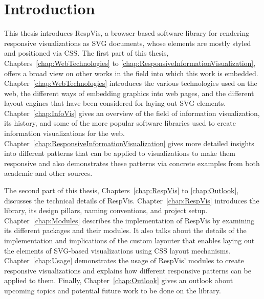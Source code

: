 \chapter{Introduction}
\label{chap:Introduction}

This thesis introduces RespVis, a browser-based software library for rendering responsive visualizations as SVG documents, whose elements are mostly styled and positioned via CSS.
The first part of this thesis, Chapters~\ref{chap:WebTechnologies} to \ref{chap:ResponsiveInformationVisualization}, offers a broad view on other works in the field into which this work is embedded. Chapter~\ref{chap:WebTechnologies} introduces the various technologies used on the web, the different ways of embedding graphics into web pages, and the different layout engines that have been considered for laying out SVG elements.
Chapter~\ref{chap:InfoVis} gives an overview of the field of information visualization, its history, and some of the more popular software libraries used to create information visualizations for the web.
Chapter~\ref{chap:ResponsiveInformationVisualization} gives more detailed insights into different patterns that can be applied to visualizations to make them responsive and also demonstrates these patterns via concrete examples from both academic and other sources.

The second part of this thesis, Chapters~\ref{chap:RespVis} to \ref{chap:Outlook}, discusses the technical details of RespVis. 
Chapter~\ref{chap:RespVis} introduces the library, its design pillars, naming conventions, and project setup.
Chapter~\ref{chap:Modules} describes the implementation of RespVis by examining its different packages and their modules. 
It also talks about the details of the implementation and implications of the custom layouter that enables laying out the elements of SVG-based visualizations using CSS layout mechanisms.
Chapter~\ref{chap:Usage} demonstrates the usage of RespVis' modules to create responsive visualizations and explains how different responsive patterns can be applied to them.
Finally, Chapter~\ref{chap:Outlook} gives an outlook about upcoming topics and potential future work to be done on the library. 
